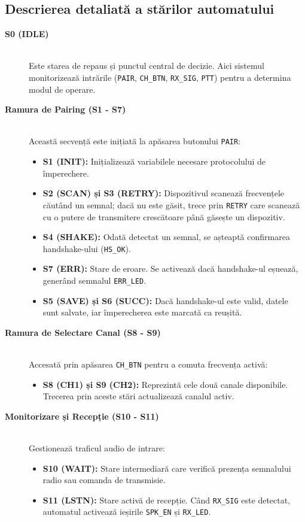 \subsection{Descrierea detaliată a stărilor automatului}

\begin{description}
    \item[\textbf{S0 (IDLE)}] \hfill \\
    Este starea de repaus și punctul central de decizie. Aici sistemul monitorizează intrările (\texttt{PAIR}, \texttt{CH\_BTN}, \texttt{RX\_SIG}, \texttt{PTT}) pentru a determina modul de operare.

    \item[\textbf{Ramura de Pairing (S1 - S7)}] \hfill \\
    Această secvență este inițiată la apăsarea butonului \texttt{PAIR}:
    \begin{itemize}
        \item \textbf{S1 (INIT):} Inițializează variabilele necesare protocolului de împerechere.
        \item \textbf{S2 (SCAN) și S3 (RETRY):} Dispozitivul scanează frecvențele căutând un semnal; dacă nu este găsit, trece prin \texttt{RETRY} care scanează cu o putere de transmitere crescătoare până găsește un dispozitiv.
        \item \textbf{S4 (SHAKE):} Odată detectat un semnal, se așteaptă confirmarea handshake-ului  (\texttt{HS\_OK}).
        \item \textbf{S7 (ERR):} Stare de eroare. Se activează dacă handshake-ul eșuează, generând semnalul \texttt{ERR\_LED}.
        \item \textbf{S5 (SAVE) și S6 (SUCC):} Dacă handshake-ul este valid, datele sunt salvate, iar împerecherea este marcată ca reușită.
    \end{itemize}

    \item[\textbf{Ramura de Selectare Canal (S8 - S9)}] \hfill \\
    Accesată prin apăsarea \texttt{CH\_BTN} pentru a comuta frecvența activă:
    \begin{itemize}
        \item \textbf{S8 (CH1) și S9 (CH2):} Reprezintă cele două canale disponibile. Trecerea prin aceste stări actualizează canalul activ.
    \end{itemize}

    \item[\textbf{Monitorizare și Recepție (S10 - S11)}] \hfill \\
    Gestionează traficul audio de intrare:
    \begin{itemize}
        \item \textbf{S10 (WAIT):} Stare intermediară care verifică prezența semnalului radio sau comanda de transmisie.
        \item \textbf{S11 (LSTN):} Stare activă de recepție. Când \texttt{RX\_SIG} este detectat, automatul activează ieșirile \texttt{SPK\_EN} și \texttt{RX\_LED}.
    \end{itemize}


\end{description}
